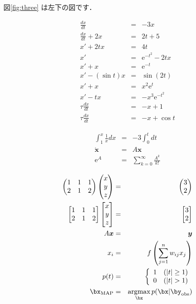 \documentclass[a4paper,11pt,dvipdfmx]{jarticle}  %
\begin{document}
図\ref{fig:three} は左下の図です．

\lhead{}
\rhead{}


\begin{eqnarray}
\frac{dx}{dt}   & = &  - 3x \\
\frac{dx}{dt}  +2x  & = & 2t + 5 \\
x' + 2tx & = & 4t  \\
x' & = & \mathrm{e}^{-t^2} -2tx \\
x' + x & = &  \mathrm{e}^{-t} \\
x' - (\sin t) x  & = &  \sin (2t) \\
x' + x  & = &  x^2 \mathrm{e}^t \\
x' - tx   & = &  - x^3 \mathrm{e}^{-t^2}  \\
\tau \frac{dx}{dt} & = &   -x + 1 \\
\tau \frac{dx}{dt} & = &   -x + \cos t 
\end{eqnarray}

\vskip 1mm

\begin{eqnarray}
\int_1^{x} \frac{1}{x}dx   & = &  - 3 \int_0^t dt \\
\dot {\bm{x}} & = & A \bm{x} \\
\mathrm{e}^{A} & = & \sum_{k=0}^\infty \frac{A^k}{k!}
\end{eqnarray}

\begin{eqnarray}
\begin{pmatrix}
1 & 1 & 1 \\
2 & 1 & 2
\end{pmatrix}
\begin{pmatrix}
x \\
y \\
z
\end{pmatrix} 
& = &
\begin{pmatrix}
3 \\
2
\end{pmatrix}
\\
\begin{bmatrix}
1 & 1 & 1 \\
2 & 1 & 2
\end{bmatrix}
\begin{bmatrix}
x \\
y \\
z
\end{bmatrix} 
& = &
\begin{bmatrix}
3 \\
2
\end{bmatrix}
\\
A \bm{x}  & = & \bm{y}
\\
x_i & = & f \left ( \sum_{j=1}^n w_{ij}  x_j \right )
\\
p(t) & = & \left\{ \begin{array}{ll}
 1 &  (|t| \geq 1 ) \\
 0 &  (|t| > 1 )
 \end{array}
 \right. 
\\
\bx_{\text{MAP}} & = &   
\mathop{\text{argmax}}_{\bx} 
p(\bx|\by_{\text{obs}} ) 
\end{eqnarray}
\end{document}
